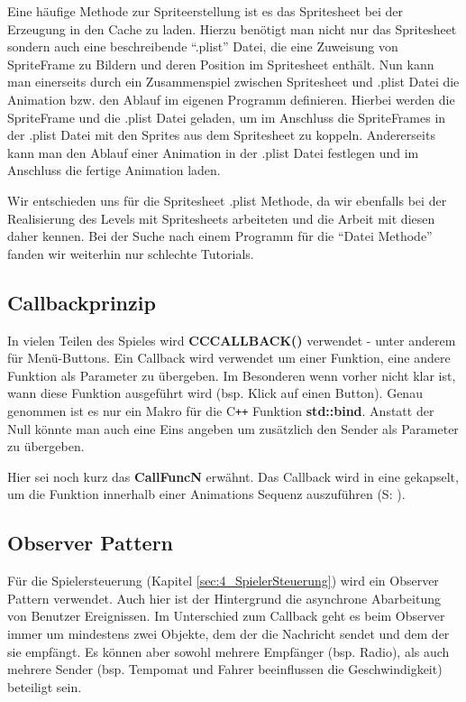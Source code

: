 Eine häufige Methode zur Spriteerstellung ist es das Spritesheet bei der Erzeugung in den Cache zu laden. 
Hierzu benötigt man nicht nur das Spritesheet sondern auch eine beschreibende “.plist” Datei, die eine Zuweisung von SpriteFrame zu Bildern und deren Position im Spritesheet enthält. Nun kann man einerseits durch ein Zusammenspiel zwischen Spritesheet und .plist Datei die Animation bzw. den Ablauf im eigenen Programm definieren. Hierbei werden die SpriteFrame und die .plist Datei geladen, um im Anschluss die SpriteFrames in der .plist Datei mit den Sprites aus dem Spritesheet zu koppeln. Andererseits kann man den Ablauf einer Animation in der .plist Datei festlegen und im Anschluss die fertige Animation laden.

Wir entschieden uns für die Spritesheet .plist Methode, da wir ebenfalls bei der Realisierung des Levels mit Spritesheets arbeiteten und die Arbeit mit diesen daher kennen. Bei der Suche nach einem Programm für die “Datei Methode” fanden wir weiterhin nur schlechte Tutorials.




\subsection{Callbackprinzip}\label{sec:2_Callbackprinzip}
In vielen Teilen des Spieles wird \textbf{CC\textunderscore CALLBACK()} verwendet - unter anderem für Menü-Buttons. Ein Callback wird verwendet um einer Funktion, eine andere Funktion als Parameter zu übergeben. Im Besonderen wenn vorher nicht klar ist, wann diese Funktion ausgeführt wird (bsp. Klick auf einen Button). Genau genommen ist es nur ein Makro für die C\texttt{++} Funktion \textbf{std::bind}. Anstatt der Null könnte man auch eine Eins angeben um zusätzlich den Sender als Parameter zu übergeben.

Hier sei noch kurz das \textbf{CallFuncN} erwähnt. Das Callback wird in eine  gekapselt, um die Funktion innerhalb einer Animations Sequenz auszuführen (S: \pageref{lst:CallFuncN}).


\subsection{Observer Pattern}

Für die Spielersteuerung (Kapitel \ref{sec:4_SpielerSteuerung}) wird ein Observer Pattern verwendet. Auch hier ist der Hintergrund die asynchrone Abarbeitung von Benutzer Ereignissen. Im Unterschied zum Callback geht es beim Observer immer um mindestens zwei Objekte, dem der die Nachricht sendet und dem der sie empfängt. Es können aber sowohl mehrere Empfänger (bsp. Radio), als auch mehrere Sender (bsp. Tempomat und Fahrer beeinflussen die Geschwindigkeit) beteiligt sein.

